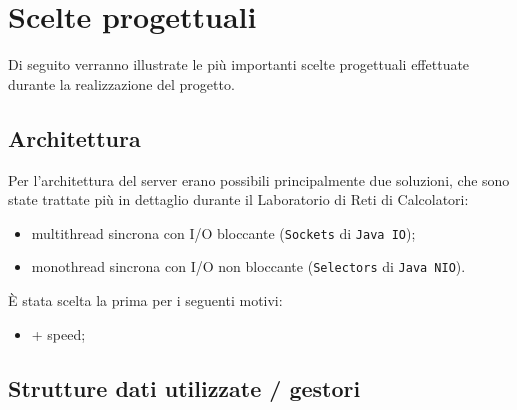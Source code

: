 \section{Scelte progettuali}
Di seguito verranno illustrate le più importanti scelte progettuali effettuate durante la realizzazione del progetto.

\subsection{Architettura}
\sloppy
Per l'architettura del server erano possibili principalmente due soluzioni, che sono state trattate più in dettaglio durante il Laboratorio di Reti di Calcolatori:
\begin{itemize}
	\item multithread sincrona con I/O bloccante (\texttt{Sockets} di \texttt{Java IO});
	\item monothread sincrona con I/O non bloccante (\texttt{Selectors} di \texttt{Java NIO}).
\end{itemize}
È stata scelta la prima per i seguenti motivi:
\begin{itemize}
	\item + speed;
\end{itemize}

\subsection{Strutture dati utilizzate / gestori}
